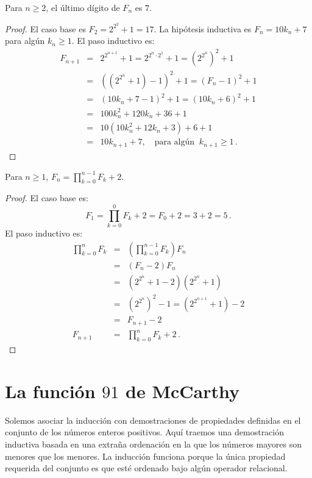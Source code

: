 \begin{theorem}
Para $n\geq 2$, el último dígito de $F_n$ es $7$.
\end{theorem}
\begin{proof}
El caso base es $F_2=2^{2^2}+1=17$.
La hipótesis inductiva es $F_n=10k_n+7$ para algún $k_n\geq 1$. El paso inductivo es:
\begin{eqnarray*}
F_{n+1}&=&2^{2^{n+1}}+1=2^{2^{n}\cdot 2^1}+1=\left(2^{2^{n}}\right)^2+1\\
&=&\left(\left(2^{2^{n}}+1\right)-1\right)^2+1=(F_n-1)^2+1\\
&=&(10k_n+7-1)^2+1=(10k_n+6)^2+1\\
&=&100k_n^2+120k_n+36+1\\
&=&10(10k_n^2+12k_n+3)+6+1\\
&=&10k_{n+1}+7,\quad \textrm{para algún} \;\;k_{n+1}\geq 1\,.
\end{eqnarray*}
\end{proof}

\begin{theorem}
Para $n\geq 1$, $\displaystyle F_n = \prod_{k=0}^{n-1} F_k + 2$.
\end{theorem}
\begin{proof}
El caso base es:
\[
F_1=\prod_{k=0}^{0} F_k + 2=F_0+2=3+2=5\,.
\]
El paso inductivo es:
\begin{eqnarray*}
\prod_{k=0}^{n}F_k&=&\left(\prod_{k=0}^{n-1}F_k\right) F_n \\
&=& (F_n-2)F_n\\
&=& \left(2^{2^n}+1-2\right)\left(2^{2^n}+1\right)\\
&=& \left(2^{2^{n}}\right)^2-1= \left(2^{2^{n+1}}+1\right)-2\\
&=&F_{n+1}-2\\
F_{n+1}&=&\prod_{k=0}^{n}F_k + 2\,.
\end{eqnarray*}
\end{proof}


\section{La función $91$ de McCarthy}\label{s.induction-mccarthy}

Solemos asociar la inducción con demostraciones de propiedades definidas en el conjunto de los números enteros positivos. Aquí traemos una demostración inductiva basada en una extraña ordenación en la que los números mayores son menores que los menores. La inducción funciona porque la única propiedad requerida del conjunto es que esté ordenado bajo algún operador relacional.

